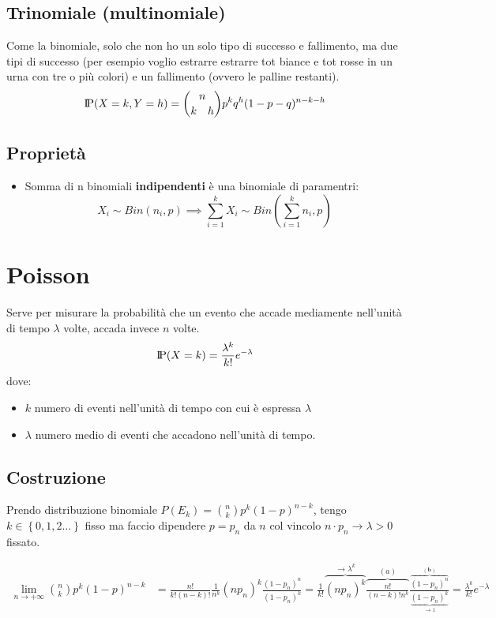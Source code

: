 \documentclass[a4paper,10pt]{article}
\newcommand{\pr}{\text{I\kern-0.15em P}} %
\theoremstyle{remark}
\theoremstyle{definition}
\begin{document}
\subsection*{Trinomiale (multinomiale)}
Come la binomiale, solo che non ho un solo tipo di successo e fallimento, ma due tipi di successo (per esempio voglio estrarre estrarre tot biance e tot rosse in un urna con tre o più colori) e un fallimento (ovvero le palline restanti).
$$\pr(X=k,Y=h)=\binom{n}{k \quad h}p^kq^h(1-p-q)^{n-k-h}$$

\subsection*{Proprietà}
\begin{itemize}
    \item Somma di n binomiali \textbf{indipendenti} è una binomiale di paramentri:
    $$X_i\sim Bin(n_i,p) \implies \sum_{i=1}^kX_i \sim Bin(\sum_{i=1}^kn_i,p)$$
\end{itemize}


\section{Poisson}
Serve per misurare la probabilità che un evento che accade mediamente nell'unità di tempo $\lambda$ volte, accada invece $n$ volte.
$$\pr(X=k)=\frac{\lambda^k}{k!}e^{-\lambda}$$
dove:
\begin{itemize}
    \item $k$ numero di eventi nell'unità di  tempo con cui è espressa $\lambda$
    \item $\lambda$ numero medio di eventi che accadono nell'unità di tempo.
\end{itemize}

\subsection*{Costruzione}

Prendo distribuzione binomiale $P\left(E_{k}\right)=\binom{n}{k}p^{k}\left(1-p\right)^{n-k}$,
tengo $k\in\left\{ 0,1,2\dots\right\} $ fisso ma faccio dipendere
$p=p_{n}$ da $n$ col vincolo $n\cdot p_{n}\rightarrow\lambda>0$
fissato.

\begin{align*}
\lim_{n\to+\infty}\binom{n}{k}p^{k}\left(1-p\right)^{n-k} & 
=\frac{n!}{k!\left(n-k\right)!}\frac{1}{n^{k}}\left(np_{n}\right)^{k}\frac{\left(1-p_{n}\right)^{n}}{\left(1-p_{n}\right)^{k}}
=\frac{1}{k!}\overset{\longrightarrow\lambda^{k}}{\overbrace{\left(np_{n}\right)^{k}}}\overset{(a)}{\overbrace{\frac{n!}{\left(n-k\right)!n^{k}}}}\frac{\overset{\left(\boldsymbol{b}\right)}{\overbrace{\left(1-p_{n}\right)^{n}}}}{\underset{\longrightarrow1}{\underbrace{\left(1-p_{n}\right)^{k}}}}
=\frac{\lambda^{k}}{k!}e^{-\lambda}
\end{align*}
\end{document}
